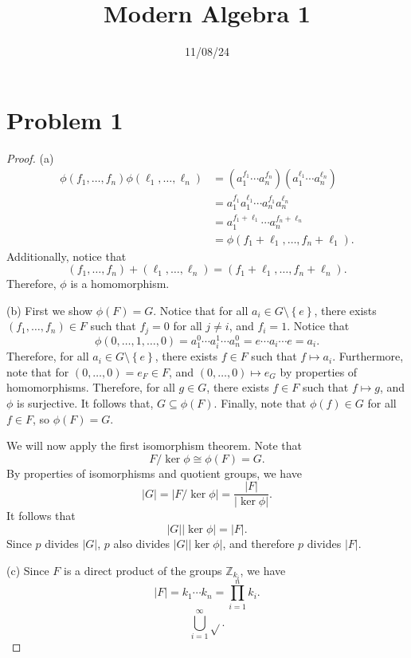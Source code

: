 \documentclass[11pt, letterpaper]{report}
\title{Modern Algebra 1}
\date{11/08/24}
\begin{document}
\makereport
\section*{Problem 1}
\begin{proof}(a)
\begin{align*}
	\phi \left( f_1, \dots, f_n  \right) \phi \left( \ell _1, \dots, \ell _n  \right) &=\left( a^{f_1}_1 \cdots a^{f_n}_n  \right) \left( a^{\ell _1}_1 \cdots a^{\ell _n}_n  \right) \\
											  &=a_1^{f_1}a_1^{\ell _1} \cdots a_n^{f_1}a_n^{\ell _n} \\
											  &=a^{f_1+\ell _1}_1 \cdots a^{f_n+\ell _n}_n \\
											  &=\phi \left( f_1+\ell _1, \dots, f_n+\ell _1  \right) 
.\end{align*}
Additionally, notice that
\[
	\left( f_1, \dots, f_n  \right) +\left( \ell _1, \dots, \ell _n  \right) =(f_1+\ell _1, \dots, f_n +\ell _n)
.\]
Therefore, $\phi $ is a homomorphism.

(b) First we show $\phi (F)=G$. Notice that for all $a_i\in G \setminus\left\{ e \right\} $, there exists $(f_1, \ldots, f_n)\in F$ such that $f_j =0$ for all $j\neq i$, and $f_i=1$. Notice that
\[
	\phi (0,\ldots,1,\ldots,0)=a_1^0 \cdots a_i^1\cdots a_n^0 = e\cdots a_i \cdots e = a_i
.\]
Therefore, for all $a_i\in G\setminus\left\{ e \right\} $, there exists $f\in F$ such that $f\mapsto a_i$. Furthermore, note that for $(0,\ldots,0)=e_F\in F$, and $\left( 0,\ldots,0 \right) \mapsto e_G$ by properties of homomorphisms. Therefore, for all $g\in G$, there exists $f\in F$ such that $f\mapsto g$, and $\phi $ is surjective. It follows that, $G\subseteq \phi (F)$. Finally, note that $\phi (f)\in G$ for all $f\in F$, so $\phi (F)=G$.

We will now apply the first isomorphism theorem. Note that
\[
	F / \ker \phi \cong \phi (F)=G
.\]
By properties of isomorphisms and quotient groups, we have
\[
	\left| G \right| = \left| F / \ker \phi  \right| =\frac{\left| F \right| }{\left| \ker \phi  \right| }
.\]
It follows that
\[
	\left| G \right| \left| \ker \phi  \right| =\left| F \right| 
.\]
Since $p$ divides $\left| G \right| $, $p$ also divides $\left| G \right| \left| \ker \phi  \right| $, and therefore $p$ divides $\left| F \right| $.

(c) Since $F$ is a direct product of the groups $\mathbb{Z}_{k_i}$, we have
\[
	\left| F \right| =k_1\cdots k_n = \prod_{i=1}^{n} k_i 
.\]
\[
	\bigcup_{i=1}^{\infty} \sqrt{} 
.\]


\end{proof}
\end{document}
